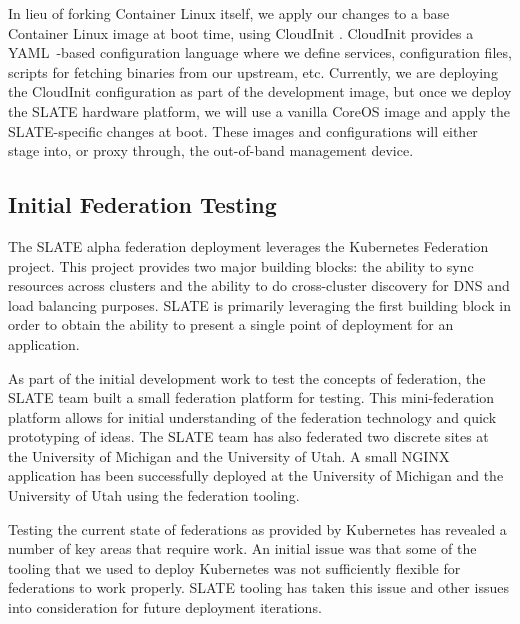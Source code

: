 \documentclass[sigconf]{acmart}
\begin{document}
In lieu of forking Container Linux itself, we apply our changes to a base Container Linux image at boot time, using CloudInit \cite{CloudInit}. CloudInit provides a YAML~\cite{YAML}-based configuration language where we define services, configuration files, scripts for fetching binaries from our upstream, etc. Currently, we are deploying the CloudInit configuration as part of the development image, but once we deploy the SLATE hardware platform, we will use a vanilla CoreOS image and apply the SLATE-specific changes at boot. These images and configurations will either stage into, or proxy through, the out-of-band management device. 

\subsection{Initial Federation Testing}

The SLATE alpha federation deployment leverages the Kubernetes Federation project\cite{KubernetesFedProject}.  This project provides two major building blocks:  the ability to sync resources across clusters and the ability to do cross-cluster discovery for DNS and load balancing purposes.  SLATE is primarily leveraging the first building block in order to obtain the ability to present a single point of deployment for an application.  

As part of the initial development work to test the concepts of federation, the SLATE team built a small federation platform for testing. This mini-federation platform allows for initial understanding of the federation technology and quick prototyping of ideas.  The SLATE team has also federated two discrete sites at the University of Michigan and the University of Utah. A small NGINX application has been successfully deployed at the University of Michigan and the University of Utah using the federation tooling. 



Testing the current state of federations as provided by Kubernetes has revealed a number of key areas that require work. An initial issue was that some of the tooling that we used to deploy Kubernetes was not sufficiently flexible for federations to work properly. SLATE tooling has taken this issue and other issues into consideration for future deployment iterations. 
\end{document}
